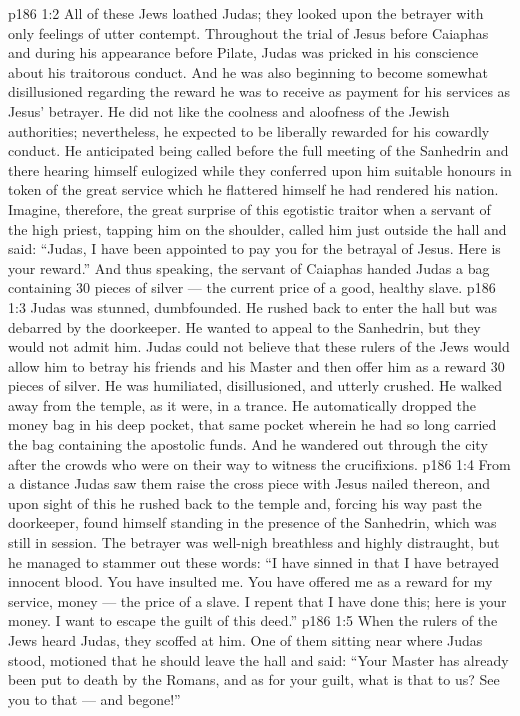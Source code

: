 \vs p186 1:2 All of these Jews loathed Judas; they looked upon the betrayer with only feelings of utter contempt. Throughout the trial of Jesus before Caiaphas and during his appearance before Pilate, Judas was pricked in his conscience about his traitorous conduct. And he was also beginning to become somewhat disillusioned regarding the reward he was to receive as payment for his services as Jesus’ betrayer. He did not like the coolness and aloofness of the Jewish authorities; nevertheless, he expected to be liberally rewarded for his cowardly conduct. He anticipated being called before the full meeting of the Sanhedrin and there hearing himself eulogized while they conferred upon him suitable honours in token of the great service which he flattered himself he had rendered his nation. Imagine, therefore, the great surprise of this egotistic traitor when a servant of the high priest, tapping him on the shoulder, called him just outside the hall and said: “Judas, I have been appointed to pay you for the betrayal of Jesus. Here is your reward.” And thus speaking, the servant of Caiaphas handed Judas a bag containing 30 pieces of silver --- the current price of a good, healthy slave.
\vs p186 1:3 Judas was stunned, dumbfounded. He rushed back to enter the hall but was debarred by the doorkeeper. He wanted to appeal to the Sanhedrin, but they would not admit him. Judas could not believe that these rulers of the Jews would allow him to betray his friends and his Master and then offer him as a reward 30 pieces of silver. He was humiliated, disillusioned, and utterly crushed. He walked away from the temple, as it were, in a trance. He automatically dropped the money bag in his deep pocket, that same pocket wherein he had so long carried the bag containing the apostolic funds. And he wandered out through the city after the crowds who were on their way to witness the crucifixions.
\vs p186 1:4 From a distance Judas saw them raise the cross piece with Jesus nailed thereon, and upon sight of this he rushed back to the temple and, forcing his way past the doorkeeper, found himself standing in the presence of the Sanhedrin, which was still in session. The betrayer was well\hyp{}nigh breathless and highly distraught, but he managed to stammer out these words: “I have sinned in that I have betrayed innocent blood. You have insulted me. You have offered me as a reward for my service, money --- the price of a slave. I repent that I have done this; here is your money. I want to escape the guilt of this deed.”
\vs p186 1:5 When the rulers of the Jews heard Judas, they scoffed at him. One of them sitting near where Judas stood, motioned that he should leave the hall and said: “Your Master has already been put to death by the Romans, and as for your guilt, what is that to us? See you to that --- and begone!”
